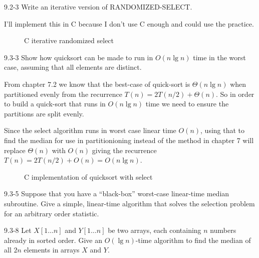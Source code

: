 

\usepackage{listings}




\homeworkheader{\classnameandsection}

\begin{problem}{9.2-3}
  Write an iterative version of RANDOMIZED-SELECT.
  \begin{solution}
    I'll implement this in C because I don't use C enough and could use the practice.
    \begin{figure}[H]
      \centering
      \caption{C iterative randomized select}
      
    \end{figure}
  \end{solution}
\end{problem}

\begin{problem}{9.3-3}
  Show how quicksort can be made to run in $O(n \lg n)$ time in the worst case, assuming that all elements are
  distinct.
  \begin{solution}
    From chapter 7.2 we know that the best-case of quick-sort is $\Theta(n \lg n)$ when partitioned evenly from the
    recurrence $T(n) = 2T(n/2) + \Theta(n)$. So in order to build a quick-sort that runs in $O(n \lg n)$ time we need to
    ensure the partitions are split evenly.

    Since the select algorithm runs in worst case linear time $O(n)$, using that to find the median for use in
    partitionioning instead of the method in chapter 7 will replace $\Theta(n)$ with $O(n)$ giving the recurrence $T(n)
    = 2T(n/2) + O(n) = O(n \lg n)$.
    \begin{figure}[H]
      \centering
      \caption{C implementation of quicksort with select}
      
    \end{figure}
  \end{solution}
\end{problem}

\begin{problem}{9.3-5}
  Suppose that you have a ``black-box'' worst-case linear-time median subroutine. Give a simple, linear-time algorithm
  that solves the selection problem for an arbitrary order statistic.
\end{problem}

\begin{problem}{9.3-8}
  Let $X[1\ldots n]$ and $Y[1\ldots n]$ be two arrays, each containing $n$ numbers already in sorted order. Give an $O(\lg
  n)$-time algorithm to find the median of all $2n$ elements in arrays $X$ and $Y$.
\end{problem}

